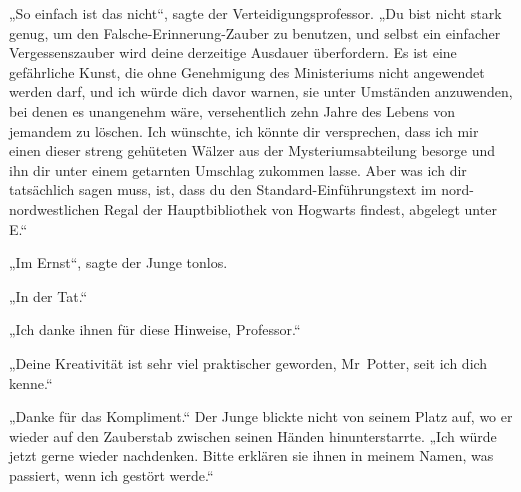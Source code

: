 „So einfach ist das nicht“, sagte der Verteidigungsprofessor.
„Du bist nicht stark genug, um den Falsche-Erinnerung-Zauber zu benutzen, und selbst ein einfacher Vergessenszauber wird deine derzeitige Ausdauer überfordern. Es ist eine gefährliche Kunst, die ohne Genehmigung des Ministeriums nicht angewendet werden darf, und ich würde dich davor warnen, sie unter Umständen anzuwenden, bei denen es unangenehm wäre, versehentlich zehn Jahre des Lebens von jemandem zu löschen. Ich wünschte, ich könnte dir versprechen, dass ich mir einen dieser streng gehüteten Wälzer aus der Mysteriumsabteilung besorge und ihn dir unter einem getarnten Umschlag zukommen lasse. Aber was ich dir tatsächlich sagen muss, ist, dass du den Standard-Einführungstext im nord-nordwestlichen Regal der Hauptbibliothek von Hogwarts findest, abgelegt unter E.“

„Im Ernst“, sagte der Junge tonlos.

„In der Tat.“

„Ich danke ihnen für diese Hinweise, Professor.“

„Deine Kreativität ist sehr viel praktischer geworden, Mr~Potter, seit ich dich kenne.“

„Danke für das Kompliment.“ Der Junge blickte nicht von seinem Platz auf, wo er wieder auf den Zauberstab zwischen seinen Händen hinunterstarrte.
„Ich würde jetzt gerne wieder nachdenken. Bitte erklären sie ihnen in meinem Namen, was passiert, wenn ich gestört werde.“

